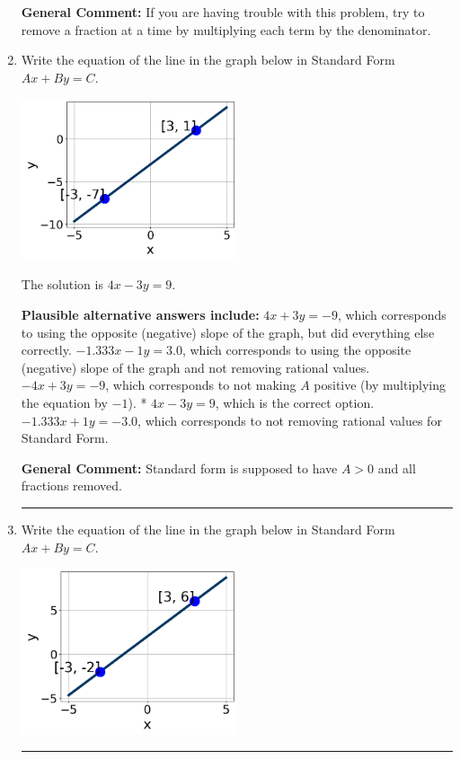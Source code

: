 \documentclass{extbook}[14pt]
\newcommand{\litem}[1]{\item #1

\rule{\textwidth}{0.4pt}}
\begin{document}
\begin{enumerate}
{\textbf{General Comment:} If you are having trouble with this problem, try to remove a fraction at a time by multiplying each term by the denominator.
}
\litem{
Write the equation of the line in the graph below in Standard Form $Ax+By=C$.

\begin{center}
    \includegraphics[width=0.5\textwidth]{../Figures/linearGraphToStandardA.png}
\end{center}


The solution is \( 4x - 3y = 9 \).\begin{enumerate}[label=\Alph*.]
\textbf{Plausible alternative answers include:} $4x + 3y = -9$, which corresponds to using the opposite (negative) slope of the graph, but did everything else correctly.
 $-1.333x - 1y = 3.0$, which corresponds to using the opposite (negative) slope of the graph and not removing rational values.
 $-4x + 3y = -9$, which corresponds to not making $A$ positive (by multiplying the equation by $-1$).
* $4x - 3y = 9$, which is the correct option.
 $-1.333x + 1y = -3.0$, which corresponds to not removing rational values for Standard Form.
\end{enumerate}

\textbf{General Comment:} Standard form is supposed to have $A > 0$ and all fractions removed.
}
\litem{
Write the equation of the line in the graph below in Standard Form $Ax+By=C$.

\begin{center}
    \includegraphics[width=0.5\textwidth]{../Figures/linearGraphToStandardCopyA.png}
\end{center}


}
\end{enumerate}
\end{document}

